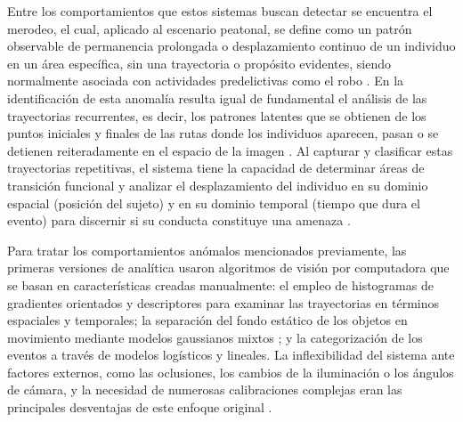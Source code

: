 \documentclass[runningheads]{llncs}
\begin{document}
Entre los comportamientos que estos sistemas buscan detectar se encuentra el merodeo, el cual, aplicado al escenario peatonal, se define como un patrón observable de permanencia prolongada o desplazamiento continuo de un individuo en un área específica, sin una trayectoria o propósito evidentes, siendo normalmente asociada con actividades predelictivas como el robo  \cite{mehmood2021,wahyono2023,waddenkery2024}. En la identificación de esta anomalía resulta igual de fundamental el análisis de las trayectorias recurrentes, es decir, los patrones latentes que se obtienen de los puntos iniciales y finales de las rutas donde los individuos aparecen, pasan o se detienen reiteradamente en el espacio de la imagen \cite{jeoung2026}. Al capturar y clasificar estas trayectorias repetitivas, el sistema tiene la capacidad de determinar áreas de transición funcional y analizar el desplazamiento del individuo en su dominio espacial (posición del sujeto) y en su dominio temporal (tiempo que dura el evento) para discernir si su conducta constituye una amenaza \cite{jeoung2026,wahyono2023}. 

Para tratar los comportamientos anómalos mencionados previamente, las primeras versiones de analítica usaron algoritmos de visión por computadora que se basan en características creadas manualmente: el empleo de histogramas de gradientes orientados y descriptores para examinar las trayectorias en términos espaciales y temporales; la separación del fondo estático de los objetos en movimiento mediante modelos gaussianos mixtos \cite{mehmood2021,wahyono2023,waddenkery2024}; y la categorización de los eventos a través de modelos logísticos y lineales. La inflexibilidad del sistema ante factores externos, como las oclusiones, los cambios de la iluminación o los ángulos de cámara, y la necesidad de numerosas calibraciones complejas eran las principales desventajas de este enfoque original \cite{choudhry2023}.
\end{document}
